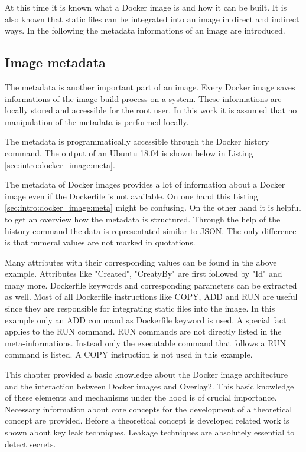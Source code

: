 At this time it is known what a Docker image is and how it can be built. 
It is also known that static files can be integrated into an image in direct and indirect ways. 
In the following the metadata informations of an image are introduced.

\subsection{Image metadata}
\label{sec:intro:docker_image:docker_img:meta}
The metadata is another important part of an image. 
Every Docker image saves informations of the image build process on a system.  
These informations are locally stored and accessible for the root user. 
In this work it is assumed that no manipulation of the metadata is performed locally. 

The metadata is programmatically accessible through the Docker history command. 
The output of an Ubuntu 18.04 is shown below in Listing \ref{sec:intro:docker_image:meta}.

The metadata of Docker images provides a lot of information about a Docker image even if the Dockerfile is not available. 
On one hand this Listing \ref{sec:intro:docker_image:meta} might be confusing. 
On the other hand it is helpful to get an overview how the metadata is structured. 
Through the help of the history command the data is representated similar to JSON. 
The only difference is that numeral values are not marked in quotations. 

Many attributes with their corresponding values can be found in the above example. 
Attributes like "Created", "CreatyBy" are first followed by "Id" and many more. 	
Dockerfile keywords and corresponding parameters can be extracted as well.
Most of all Dockerfile instructions like COPY, ADD and RUN are useful since they are responsible for integrating static files into the image.
In this example only an ADD command as Dockerfile keyword is used.
A special fact applies to the RUN command. 
RUN commands are not directly listed in the meta-informations.
Instead only the executable command that follows a RUN command is listed.
A COPY instruction is not used in this example.

This chapter provided a basic knowledge about the Docker image architecture and the interaction between Docker images and Overlay2. 
This basic knowledge of these elements and mechanisms under the hood is of crucial importance. 
Necessary information about core concepts for the development of a theoretical concept are provided.
Before a theoretical concept is developed related work is shown about key leak techniques.
Leakage techniques are absolutely essential to detect secrets.